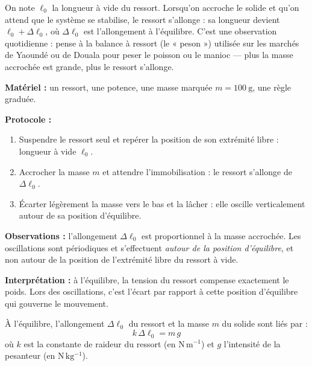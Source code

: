 \documentclass[11pt]{article}
\newcommand{\cle}[1]{{\popxbold\color{popdark}#1}}
\newcounter{popsec}
\newcounter{popsub}
\newcommand{\courssub}[1]{%
  \stepcounter{popsub}%
  \par\vspace{9pt}\noindent{\popxbold\fontsize{11.5}{13}\selectfont\color{popink}{\color{poporange}\thepopsec.\thepopsub}\hspace{6pt}#1}\par\nopagebreak\vspace{4pt}
}
\begin{document}
On note $\ell_0$ la longueur à vide du ressort. Lorsqu'on accroche le solide et qu'on attend que le système se stabilise, le ressort s'allonge : sa longueur devient $\ell_0 + \Delta\ell_0$, où $\Delta\ell_0$ est l'\cle{allongement à l'équilibre}. C'est une observation quotidienne : pense à la balance à ressort (le « peson ») utilisée sur les marchés de Yaoundé ou de Douala pour peser le poisson ou le manioc — plus la masse accrochée est grande, plus le ressort s'allonge.

\begin{experience}
\textbf{Matériel :} un ressort, une potence, une masse marquée $m = 100~\mathrm{g}$, une règle graduée.

\textbf{Protocole :}
\begin{enumerate}
\item Suspendre le ressort seul et repérer la position de son extrémité libre : longueur à vide $\ell_0$.
\item Accrocher la masse $m$ et attendre l'immobilisation : le ressort s'allonge de $\Delta\ell_0$.
\item Écarter légèrement la masse vers le bas et la lâcher : elle oscille verticalement autour de sa position d'équilibre.
\end{enumerate}

\textbf{Observations :} l'allongement $\Delta\ell_0$ est proportionnel à la masse accrochée. Les oscillations sont périodiques et s'effectuent \emph{autour de la position d'équilibre}, et non autour de la position de l'extrémité libre du ressort à vide.

\textbf{Interprétation :} à l'équilibre, la tension du ressort compense exactement le poids. Lors des oscillations, c'est l'écart par rapport à cette position d'équilibre qui gouverne le mouvement.
\end{experience}

\courssub{Condition d'équilibre}

\begin{propriete}
À l'équilibre, l'allongement $\Delta\ell_0$ du ressort et la masse $m$ du solide sont liés par :
\[ k\,\Delta\ell_0 = m\,g \]
où $k$ est la constante de raideur du ressort (en $\mathrm{N\,m^{-1}}$) et $g$ l'intensité de la pesanteur (en $\mathrm{N\,kg^{-1}}$).
\end{propriete}
\end{document}
